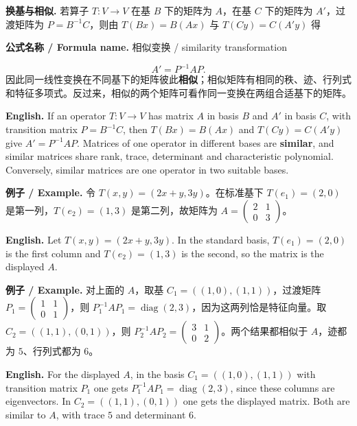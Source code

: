 \documentclass[UTF8,11pt,a4paper]{ctexart}
\newcommand{\EN}[1]{\par\noindent\textbf{English.} #1\par}
\newcommand{\FORMULA}[2]{\par\noindent\textbf{公式名称 / Formula name.} #1 / #2\par}
\newcommand{\EX}[2]{\par\noindent\textbf{例子 / Example.} #1\par\EN{#2}}
\begin{document}
\noindent\textbf{换基与相似.} 若算子 $T:V\to V$ 在基 $B$ 下的矩阵为 $A$，在基 $C$ 下的矩阵为 $A'$，过渡矩阵为 $P=B^{-1}C$，则由 $T(Bx)=B(Ax)$ 与 $T(Cy)=C(A'y)$ 得
\FORMULA{相似变换}{similarity transformation}
\[
A'=P^{-1}AP.
\]
因此同一线性变换在不同基下的矩阵彼此\textbf{相似}；相似矩阵有相同的秩、迹、行列式和特征多项式。反过来，相似的两个矩阵可看作同一变换在两组合适基下的矩阵。
\EN{If an operator $T:V\to V$ has matrix $A$ in basis $B$ and $A'$ in basis $C$, with transition matrix $P=B^{-1}C$, then $T(Bx)=B(Ax)$ and $T(Cy)=C(A'y)$ give $A'=P^{-1}AP$. Matrices of one operator in different bases are \textbf{similar}, and similar matrices share rank, trace, determinant and characteristic polynomial. Conversely, similar matrices are one operator in two suitable bases.}
\EX{令 $T(x,y)=(2x+y,3y)$。在标准基下 $T(e_1)=(2,0)$ 是第一列，$T(e_2)=(1,3)$ 是第二列，故矩阵为 $A=\begin{pmatrix}2&1\\0&3\end{pmatrix}$。}{Let $T(x,y)=(2x+y,3y)$. In the standard basis, $T(e_1)=(2,0)$ is the first column and $T(e_2)=(1,3)$ is the second, so the matrix is the displayed $A$.}
\EX{对上面的 $A$，取基 $C_1=((1,0),(1,1))$，过渡矩阵 $P_1=\begin{pmatrix}1&1\\0&1\end{pmatrix}$，则 $P_1^{-1}AP_1=\operatorname{diag}(2,3)$，因为这两列恰是特征向量。取 $C_2=((1,1),(0,1))$，则 $P_2^{-1}AP_2=\begin{pmatrix}3&1\\0&2\end{pmatrix}$。两个结果都相似于 $A$，迹都为 $5$、行列式都为 $6$。}{For the displayed $A$, in the basis $C_1=((1,0),(1,1))$ with transition matrix $P_1$ one gets $P_1^{-1}AP_1=\operatorname{diag}(2,3)$, since these columns are eigenvectors. In $C_2=((1,1),(0,1))$ one gets the displayed matrix. Both are similar to $A$, with trace $5$ and determinant $6$.}
\end{document}
